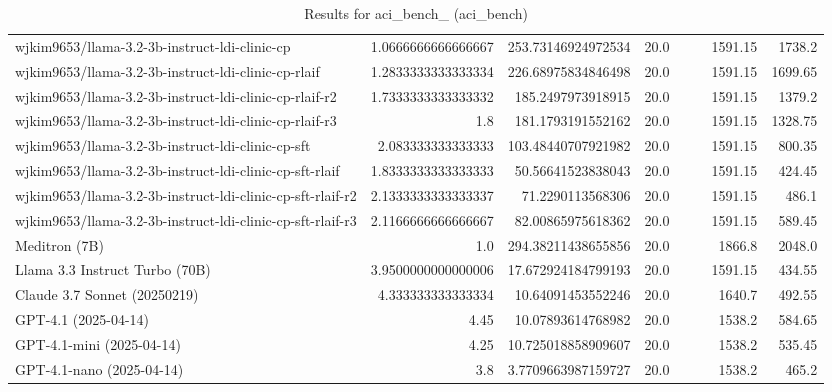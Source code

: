 \begin{table}[htp]
{\begin{tabular}{lrrrrrrr}
wjkim9653/llama-3.2-3b-instruct-ldi-clinic-cp & 1.0666666666666667 & 253.73146924972534 & 20.0 &  &  & 1591.15 & 1738.2 \\
wjkim9653/llama-3.2-3b-instruct-ldi-clinic-cp-rlaif & 1.2833333333333334 & 226.68975834846498 & 20.0 &  &  & 1591.15 & 1699.65 \\
wjkim9653/llama-3.2-3b-instruct-ldi-clinic-cp-rlaif-r2 & 1.7333333333333332 & 185.2497973918915 & 20.0 &  &  & 1591.15 & 1379.2 \\
wjkim9653/llama-3.2-3b-instruct-ldi-clinic-cp-rlaif-r3 & 1.8 & 181.1793191552162 & 20.0 &  &  & 1591.15 & 1328.75 \\
wjkim9653/llama-3.2-3b-instruct-ldi-clinic-cp-sft & 2.083333333333333 & 103.48440707921982 & 20.0 &  &  & 1591.15 & 800.35 \\
wjkim9653/llama-3.2-3b-instruct-ldi-clinic-cp-sft-rlaif & 1.8333333333333333 & 50.56641523838043 & 20.0 &  &  & 1591.15 & 424.45 \\
wjkim9653/llama-3.2-3b-instruct-ldi-clinic-cp-sft-rlaif-r2 & 2.1333333333333337 & 71.2290113568306 & 20.0 &  &  & 1591.15 & 486.1 \\
wjkim9653/llama-3.2-3b-instruct-ldi-clinic-cp-sft-rlaif-r3 & 2.1166666666666667 & 82.00865975618362 & 20.0 &  &  & 1591.15 & 589.45 \\
Meditron (7B) & 1.0 & 294.38211438655856 & 20.0 &  &  & 1866.8 & 2048.0 \\
Llama 3.3 Instruct Turbo (70B) & 3.9500000000000006 & 17.672924184799193 & 20.0 &  &  & 1591.15 & 434.55 \\
Claude 3.7 Sonnet (20250219) & 4.333333333333334 & 10.64091453552246 & 20.0 &  &  & 1640.7 & 492.55 \\
GPT-4.1 (2025-04-14) & 4.45 & 10.07893614768982 & 20.0 &  &  & 1538.2 & 584.65 \\
GPT-4.1-mini (2025-04-14) & 4.25 & 10.725018858909607 & 20.0 &  &  & 1538.2 & 535.45 \\
GPT-4.1-nano (2025-04-14) & 3.8 & 3.7709663987159727 & 20.0 &  &  & 1538.2 & 465.2 \\
\bottomrule
\end{tabular}}
\caption{Results for aci_bench_ (aci_bench)}
\label{fig:aci_bench_ (aci_bench)}
\end{table}